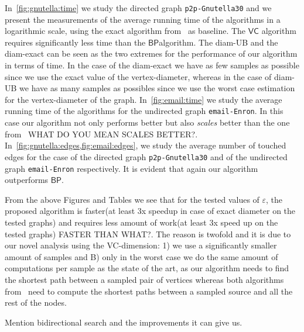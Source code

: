 In~\cref{fig:gnutella:time} we study the directed graph \texttt{p2p-Gnutella30}
and we present the measurements of the average running time of the algorithms in
a logarithmic scale, using the exact algorithm from~\citep{Brandes01} as
baseline. The $\mathsf{VC}$ algorithm requires significantly less time
than the $\mathsf{BP}$algorithm. The diam-UB and the diam-exact can be seen as
the two extremes for the performance of our algorithm in terms of time. In the
case of the diam-exact we have as few samples as possible since we use the exact
value of the vertex-diameter, whereas in the case of diam-UB we have as many
samples as possibles since we use the worst case estimation for the
vertex-diameter of the graph. 
In~\cref{fig:email:time} we study the average running time of the algorithms for
the undirected graph \texttt{email-Enron}. In this case our algorithm not only
performs better but also \emph{scales} better than the one
from~\citep{BrandesP07} \XXX WHAT DO YOU MEAN SCALES BETTER?. 
In~\cref{fig:gnutella:edges,fig:email:edges}, we study the average number of
touched edges for the case of the directed graph \texttt{p2p-Gnutella30} and of
the undirected graph \texttt{email-Enron} respectively. It is evident that again
our algorithm outperforms $\mathsf{BP}$. 

From the above Figures and Tables we see that for the tested values of
$\varepsilon$, the proposed algorithm is faster(at least 3x speedup in case of
exact diameter on the tested graphs) and requires less amount of work(at least
3x speed up on the tested graphs) \XXX FASTER THAN WHAT?. The reason is twofold
and it is due to our novel analysis using the VC-dimension: 1) we use a
significantly smaller amount of samples and B) only in the
worst case  we do the same amount of computations per sample as
the state of the art, as our algorithm needs to find the shortest path between a
sampled pair of vertices whereas both 
algorithms from~\citep{GeisbergerSS08,BrandesP07}  need to compute the shortest
paths between a sampled source and all the rest of the nodes.

\XXX Mention bidirectional search and the improvements it can give us.

